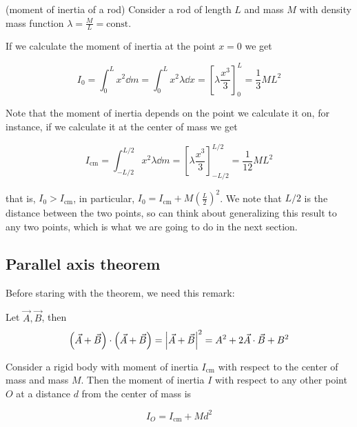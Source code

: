 \documentclass[12pt]{extarticle}
\begin{document}
\begin{example}(moment of inertia of a rod)
    Consider a rod of length $L$ and mass $M$ with density mass function $\lambda = \frac{M}{L} = \text{const}$.

    If we calculate the moment of inertia at the point $x = 0$ we get

    \begin{equation}
        I_0 = \int_0^L x^2 \dd{m} = \int_0^L x^2 \lambda \dd{x} = \left[ \lambda \frac{x^3}{3} \right]_0^L = \frac{1}{3} ML^2
    \end{equation}

    Note that the moment of inertia depends on the point we calculate it on, for instance, if we calculate it at the center of mass we get

    \begin{equation}
        I_{\text{cm}} = \int_{-L/2}^{L/2} x^2 \lambda \dd{m} = \left[ \lambda \frac{x^3}{3} \right]_{-L/2}^{L/2} = \frac{1}{12} ML^2
    \end{equation}


    that is, $I_0 > I_{\text{cm}}$, in particular, $I_0 = I_{\text{cm}} + M \left(\frac{L}{2}\right)^2$.
    We note that $L/2$ is the distance between the two points, so can think about generalizing this result to any two points, which is what we are going to do in the next section.
\end{example}

\subsection{Parallel axis theorem}

Before staring with the theorem, we need this remark:
\begin{remark}
    Let $\vec{A}, \vec{B}$, then
    \begin{equation}
        \left( \vec{A} + \vec{B} \right) \cdot \left( \vec{A} + \vec{B} \right) = \abs{\vec{A} + \vec{B}}^2 = A^2 + 2 \vec{A} \cdot \vec{B} + B^2
    \end{equation}
\end{remark}

\begin{theorem}
    Consider a rigid body with moment of inertia $I_{\text{cm}}$ with respect to the center of mass and mass $M$. Then the moment of inertia $I$ with respect to any other point $O$ at a distance $d$ from the center of mass is

    \begin{equation}
        I_O = I_{\text{cm}} + M d^2
    \end{equation}

    \label{thm:parallel_axis}
\end{theorem}
\end{document}
